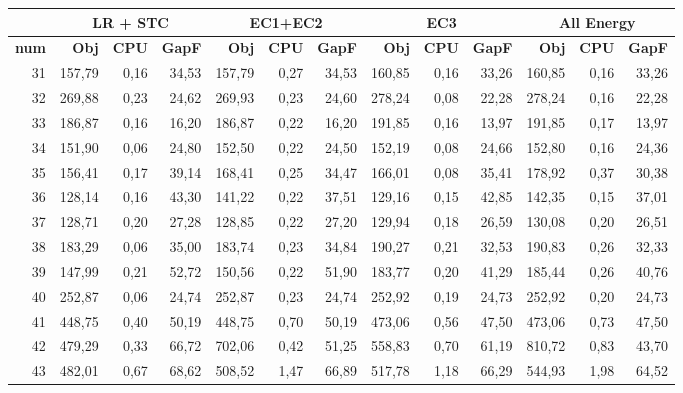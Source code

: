 {%
\begin{table}[H]
	\centering
	\small
	\begin{tabular}{|r|rrr|rrr|rrr|rrr|}
		\toprule
		\hline
		\rowcolor{cyan}	&\multicolumn{3}{c|}{\textbf{LR + STC}} & \multicolumn{3}{c|}{\textbf{EC1+EC2}}&\multicolumn{3}{c|}{\textbf{EC3}}&\multicolumn{3}{c|}{\textbf{All Energy}} \\ \hline
		\midrule
		\rowcolor{cyan}	\textbf{num} & \textbf{Obj} & \textbf{CPU} & \textbf{GapF} & \textbf{Obj} & \textbf{CPU}  & \textbf{GapF} & \textbf{Obj} & \textbf{CPU} &  \textbf{GapF} &\textbf{Obj} & \textbf{CPU} & \textbf{GapF} \\ \hline
		\midrule
		31	&	157,79	&	0,16	&	34,53	&	157,79	&	0,27	&	34,53	&	160,85	&	0,16	&	33,26	&	160,85	&	0,16	&	33,26	\\ \hline
		32	&	269,88	&	0,23	&	24,62	&	269,93	&	0,23	&	24,60	&	278,24	&	0,08	&	22,28	&	278,24	&	0,16	&	22,28	\\ \hline
		33	&	186,87	&	0,16	&	16,20	&	186,87	&	0,22	&	16,20	&	191,85	&	0,16	&	13,97	&	191,85	&	0,17	&	13,97	\\ \hline
		34	&	151,90	&	0,06	&	24,80	&	152,50	&	0,22	&	24,50	&	152,19	&	0,08	&	24,66	&	152,80	&	0,16	&	24,36	\\ \hline
		35	&	156,41	&	0,17	&	39,14	&	168,41	&	0,25	&	34,47	&	166,01	&	0,08	&	35,41	&	178,92	&	0,37	&	30,38	\\ \hline
		36	&	128,14	&	0,16	&	43,30	&	141,22	&	0,22	&	37,51	&	129,16	&	0,15	&	42,85	&	142,35	&	0,15	&	37,01	\\ \hline
		37	&	128,71	&	0,20	&	27,28	&	128,85	&	0,22	&	27,20	&	129,94	&	0,18	&	26,59	&	130,08	&	0,20	&	26,51	\\ \hline
		38	&	183,29	&	0,06	&	35,00	&	183,74	&	0,23	&	34,84	&	190,27	&	0,21	&	32,53	&	190,83	&	0,26	&	32,33	\\ \hline
		39	&	147,99	&	0,21	&	52,72	&	150,56	&	0,22	&	51,90	&	183,77	&	0,20	&	41,29	&	185,44	&	0,26	&	40,76	\\ \hline
		40	&	252,87	&	0,06	&	24,74	&	252,87	&	0,23	&	24,74	&	252,92	&	0,19	&	24,73	&	252,92	&	0,20	&	24,73	\\ \hline
		41	&	448,75	&	0,40	&	50,19	&	448,75	&	0,70	&	50,19	&	473,06	&	0,56	&	47,50	&	473,06	&	0,73	&	47,50	\\ \hline
		42	&	479,29	&	0,33	&	66,72	&	702,06	&	0,42	&	51,25	&	558,83	&	0,70	&	61,19	&	810,72	&	0,83	&	43,70	\\ \hline
		43	&	482,01	&	0,67	&	68,62	&	508,52	&	1,47	&	66,89	&	517,78	&	1,18	&	66,29	&	544,93	&	1,98	&	64,52	\\ \hline

\end{tabular}
\end{table}}

